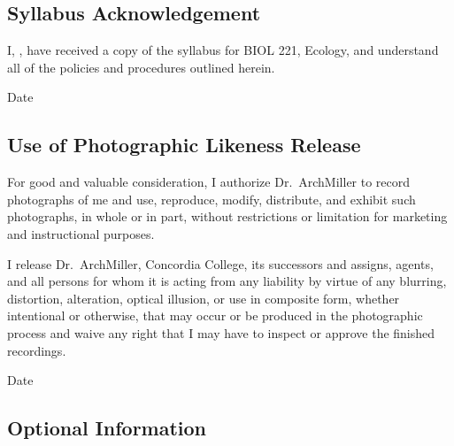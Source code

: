 \documentclass{tufte-handout}
\begin{document}


\newpage

\subsection{Syllabus Acknowledgement}

I, \underline{\hspace{5cm}}, have received a copy of the syllabus for BIOL 221, Ecology, and understand all of the policies and procedures outlined herein. 

  \underline{\hspace{5cm}} {Date}  \hrulefill


\subsection{Use of Photographic Likeness Release}

For good and valuable consideration, I authorize Dr.~ArchMiller to record photographs of me and use, reproduce, modify, distribute, and exhibit such photographs, in whole or in part, without restrictions or limitation for marketing and instructional purposes. 

I release Dr.~ArchMiller, Concordia College, its successors and assigns, agents, and all persons for whom it is acting from any liability by virtue of any blurring, distortion, alteration, optical illusion, or use in composite form, whether intentional or otherwise, that may occur or be produced in the photographic process and waive any right that I may have to inspect or approve the finished recordings.

  \hrulefill
{}  \underline{\hspace{5cm}} {Date}  \hrulefill

\subsection{Optional Information}

 \hrulefill

 \hrulefill

 \hrulefill

 \hrulefill


 \hrulefill

\hrulefill

\hrulefill

\hrulefill

\hrulefill

\hrulefill
\end{document}
